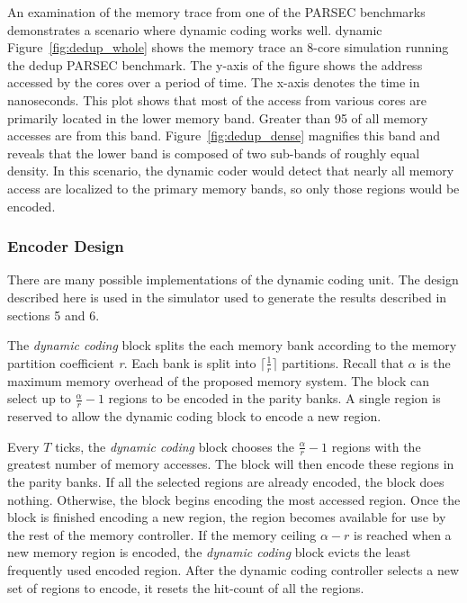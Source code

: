 An examination of the memory trace from one of the PARSEC benchmarks demonstrates a scenario where dynamic coding works well. dynamic Figure~\ref{fig:dedup_whole} shows the memory trace an 8-core simulation running the dedup PARSEC benchmark. The y-axis of the figure shows the address accessed by the cores over a period of time. The x-axis denotes the time in nanoseconds. This plot shows that most of the access from various cores are primarily located in the lower memory band. Greater than 95 of all memory accesses are from this band. Figure~\ref{fig:dedup_dense} magnifies this band and reveals that the lower band is composed of two sub-bands of roughly equal density. In this scenario, the dynamic coder would detect that nearly all memory access are localized to the primary memory bands, so only those regions would be encoded.

\subsubsection{Encoder Design}
There are many possible implementations of the dynamic coding unit. The design described here is used in the simulator used to generate the results described in sections 5 and 6.

The {\em dynamic coding} block splits the each memory bank according to the memory partition coefficient {\em r}. Each bank is split into $\lceil\frac{1}{r}\rceil$ partitions. Recall that $\alpha$ is the maximum memory overhead of the proposed memory system. The block can select up to $\frac{\alpha}{r} - 1$ regions to be encoded in the parity banks. A single region is reserved to allow the dynamic coding block to encode a new region.

Every $T$ ticks, the {\em dynamic coding} block chooses the $\frac{\alpha}{r} - 1$ regions with the greatest number of memory accesses. The block will then encode these regions in the parity banks. If all the selected regions are already encoded, the block does nothing. Otherwise, the block begins encoding the most accessed region. Once the block is finished encoding a new region, the region becomes available for use by the rest of the memory controller. If the memory ceiling $\alpha - r$ is reached when a new memory region is encoded, the {\em dynamic coding} block evicts the least frequently used encoded region. After the dynamic coding controller selects a new set of regions to encode, it resets the hit-count of all the regions.

